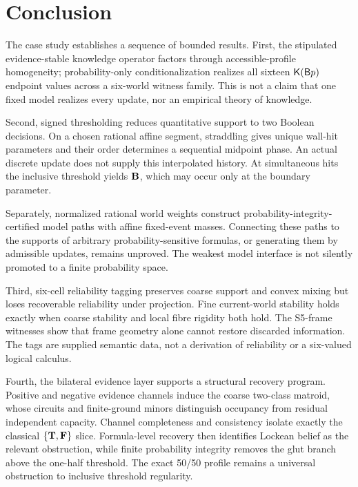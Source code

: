 \section{Conclusion}
\label{sec:conclusion}

The case study establishes a sequence of bounded results. First, the stipulated evidence-stable knowledge operator factors through accessible-profile homogeneity; probability-only conditionalization realizes all sixteen \(\mathsf{K}(\mathsf{B} p)\) endpoint values across a six-world witness family. This is not a claim that one fixed model realizes every update, nor an empirical theory of knowledge.

Second, signed thresholding reduces quantitative support to two Boolean decisions. On a chosen rational affine segment, straddling gives unique wall-hit parameters and their order determines a sequential midpoint phase. An actual discrete update does not supply this interpolated history. At simultaneous hits the inclusive threshold yields \(\mathbf{B}\), which may occur only at the boundary parameter.

Separately, normalized rational world weights construct probability-integrity-certified model paths with affine fixed-event masses. Connecting these paths to the supports of arbitrary probability-sensitive formulas, or generating them by admissible updates, remains unproved. The weakest model interface is not silently promoted to a finite probability space.

Third, six-cell reliability tagging preserves coarse support and convex mixing but loses recoverable reliability under projection. Fine current-world stability holds exactly when coarse stability and local fibre rigidity both hold. The S5-frame witnesses show that frame geometry alone cannot restore discarded information. The tags are supplied semantic data, not a derivation of reliability or a six-valued logical calculus.

Fourth, the bilateral evidence layer supports a structural recovery program. Positive and negative evidence channels induce the coarse two-class matroid, whose circuits and finite-ground minors distinguish occupancy from residual independent capacity. Channel completeness and consistency isolate exactly the classical \(\{\mathbf{T},\mathbf{F}\}\) slice. Formula-level recovery then identifies Lockean belief as the relevant obstruction, while finite probability integrity removes the glut branch above the one-half threshold. The exact 50/50 profile remains a universal obstruction to inclusive threshold regularity.

